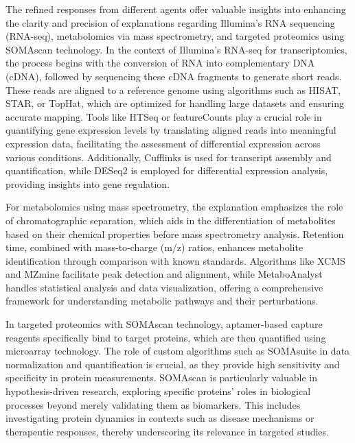 The refined responses from different agents offer valuable insights into enhancing the clarity and precision of explanations regarding Illumina's RNA sequencing (RNA-seq), metabolomics via mass spectrometry, and targeted proteomics using SOMAscan technology. In the context of Illumina's RNA-seq for transcriptomics, the process begins with the conversion of RNA into complementary DNA (cDNA), followed by sequencing these cDNA fragments to generate short reads. These reads are aligned to a reference genome using algorithms such as HISAT, STAR, or TopHat, which are optimized for handling large datasets and ensuring accurate mapping. Tools like HTSeq or featureCounts play a crucial role in quantifying gene expression levels by translating aligned reads into meaningful expression data, facilitating the assessment of differential expression across various conditions. Additionally, Cufflinks is used for transcript assembly and quantification, while DESeq2 is employed for differential expression analysis, providing insights into gene regulation.

For metabolomics using mass spectrometry, the explanation emphasizes the role of chromatographic separation, which aids in the differentiation of metabolites based on their chemical properties before mass spectrometry analysis. Retention time, combined with mass-to-charge (m/z) ratios, enhances metabolite identification through comparison with known standards. Algorithms like XCMS and MZmine facilitate peak detection and alignment, while MetaboAnalyst handles statistical analysis and data visualization, offering a comprehensive framework for understanding metabolic pathways and their perturbations.

In targeted proteomics with SOMAscan technology, aptamer-based capture reagents specifically bind to target proteins, which are then quantified using microarray technology. The role of custom algorithms such as SOMAsuite in data normalization and quantification is crucial, as they provide high sensitivity and specificity in protein measurements. SOMAscan is particularly valuable in hypothesis-driven research, exploring specific proteins' roles in biological processes beyond merely validating them as biomarkers. This includes investigating protein dynamics in contexts such as disease mechanisms or therapeutic responses, thereby underscoring its relevance in targeted studies.